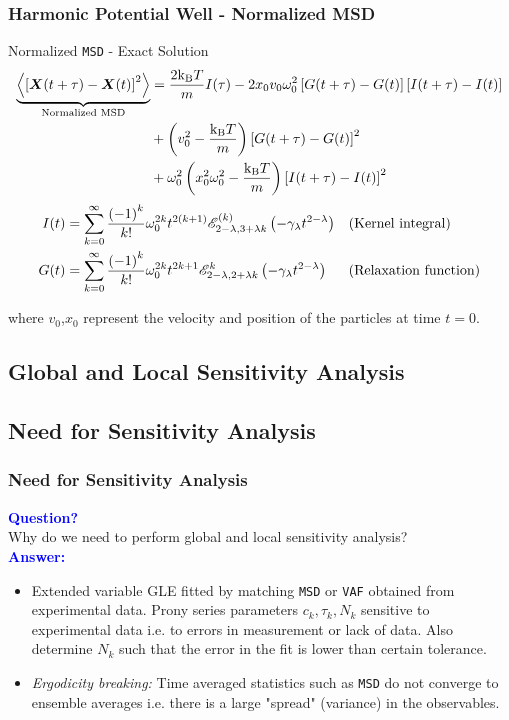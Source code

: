 \documentclass[a4paper,10pt]{beamer}
\newcommand{\BS}[1]{\boldsymbol{#1}}
\newcommand{\sqb}[1]{\left[ #1 \right]}
\newcommand{\rb}[1]{\left( #1 \right)}
\newcommand{\angbrac}[1]{\left \langle #1 \right \rangle}
\begin{document}
	\begin{frame}
		\frametitle{Harmonic Potential Well - Normalized MSD}
		\begin{alertblock}{Normalized \texttt{MSD} - Exact Solution}
			\footnotesize
			\begin{align}
				\notag
				\underbrace{\angbrac{\sqb{\BS{X}(t+\tau)-\BS{X}(t)}^{2}}}_{\text{Normalized MSD}} &= \frac{2\text{k}_{\text{B}}T}{m} I(\tau) - 2 x_{0} v_{0} \omega_{0}^{2} \sqb{G(t+\tau) - G(t)}\sqb{I(t+\tau) - I(t)} \\
				\notag 
				&+ \rb{v_{0}^{2} - \frac{\text{k}_{\text{B}}T}{m}} \sqb{G(t+\tau)-G(t)}^{2} \\
				\notag
				&+ \omega_{0}^{2} \rb{x_{0}^{2} \omega_{0}^{2} - \frac{\text{k}_\text{B} T}{m}} \sqb{I(t+\tau)-I(t)}^{2}
			\end{align}
			\begin{align}
				\notag
				I(t) &= \sum_{k=0}^{\infty} \frac{\rb{-1}^{k}}{k!} \omega_{0}^{2k} t^{2(k+1)} \mathscr{E}^{(k)}_{2-\lambda,3+\lambda k} \rb{- \gamma_{\lambda} t^{2-\lambda}} && \text{(Kernel integral)}\\
				\notag
				G(t) &= \sum_{k=0}^{\infty} \frac{\rb{-1}^{k}}{k!} \omega_{0}^{2k} t^{2k+1} \mathscr{E}^{k}_{2-\lambda,2+\lambda k} \rb{- \gamma_{\lambda} t^{2-\lambda}} && \text{(Relaxation function)}
			\end{align}
		\end{alertblock}
		where $v_{0}$,$x_{0}$ represent the velocity and position of the particles at time $t=0$.
	\end{frame}

	\begin{frame}
		\section{Global and Local Sensitivity Analysis}
		\subsection{Need for Sensitivity Analysis}
		\frametitle{Need for Sensitivity Analysis}
		\textcolor{blue}{\textbf{Question?}} \\ \vspace{0.2cm} Why do we need to perform global and local sensitivity analysis? \vspace{0.2cm} \\
		\textcolor{blue}{\textbf{Answer:}} \\
		\begin{itemize}
			\item {Extended variable GLE fitted by matching \texttt{MSD} or \texttt{VAF} obtained from experimental data. Prony series parameters $c_{k},\tau_{k},N_{k}$ sensitive to experimental data i.e. to errors in measurement or lack of data. Also determine $N_{k}$ such that the error in the fit is lower than certain tolerance.}
			\item {\textit{Ergodicity breaking:} Time averaged statistics such as \texttt{MSD} do not converge to ensemble averages i.e. there is a large "spread" (variance) in the observables.}
		\end{itemize}
	\end{frame}
\end{document}
